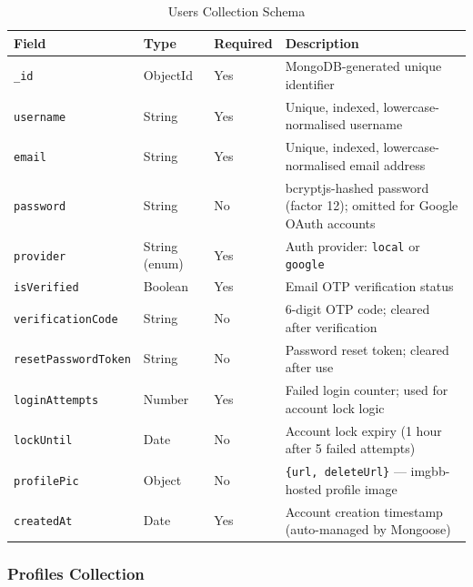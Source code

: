\documentclass[12pt, a4paper, oneside]{report}
\begin{document}
\begin{table}[H]
\centering
\caption{Users Collection Schema}
\label{tab:schema_users}
\renewcommand{\arraystretch}{1.4}
\begin{tabularx}{\textwidth}{|p{3.5cm}|p{2.5cm}|p{1.5cm}|X|}
\hline
\textbf{Field} & \textbf{Type} & \textbf{Required} & \textbf{Description} \\
\hline
\texttt{\_id} & ObjectId & Yes & MongoDB-generated unique identifier \\
\hline
\texttt{username} & String & Yes & Unique, indexed, lowercase-normalised username \\
\hline
\texttt{email} & String & Yes & Unique, indexed, lowercase-normalised email address \\
\hline
\texttt{password} & String & No & bcryptjs-hashed password (factor 12); omitted for Google OAuth accounts \\
\hline
\texttt{provider} & String (enum) & Yes & Auth provider: \texttt{local} or \texttt{google} \\
\hline
\texttt{isVerified} & Boolean & Yes & Email OTP verification status \\
\hline
\texttt{verificationCode} & String & No & 6-digit OTP code; cleared after verification \\
\hline
\texttt{resetPasswordToken} & String & No & Password reset token; cleared after use \\
\hline
\texttt{loginAttempts} & Number & Yes & Failed login counter; used for account lock logic \\
\hline
\texttt{lockUntil} & Date & No & Account lock expiry (1 hour after 5 failed attempts) \\
\hline
\texttt{profilePic} & Object & No & \texttt{\{url, deleteUrl\}} --- imgbb-hosted profile image \\
\hline
\texttt{createdAt} & Date & Yes & Account creation timestamp (auto-managed by Mongoose) \\
\hline
\end{tabularx}
\end{table}

\subsubsection{Profiles Collection}
\end{document}

